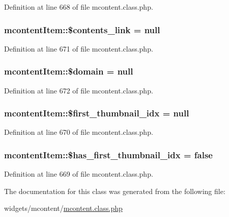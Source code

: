 Definition at line 668 of file mcontent.\+class.\+php.

\subsubsection[{\texorpdfstring{\$contents\+\_\+link}{$contents_link}}]{\setlength{\rightskip}{0pt plus 5cm}mcontent\+Item\+::\$contents\+\_\+link = {\bf null}}\hypertarget{classmcontentItem_afdee32faf59897fa7e02f9ed4389b411}{}\label{classmcontentItem_afdee32faf59897fa7e02f9ed4389b411}


Definition at line 671 of file mcontent.\+class.\+php.

\subsubsection[{\texorpdfstring{\$domain}{$domain}}]{\setlength{\rightskip}{0pt plus 5cm}mcontent\+Item\+::\$domain = {\bf null}}\hypertarget{classmcontentItem_ad92b662d98d23cb2a10747de7ffdada0}{}\label{classmcontentItem_ad92b662d98d23cb2a10747de7ffdada0}


Definition at line 672 of file mcontent.\+class.\+php.

\subsubsection[{\texorpdfstring{\$first\+\_\+thumbnail\+\_\+idx}{$first_thumbnail_idx}}]{\setlength{\rightskip}{0pt plus 5cm}mcontent\+Item\+::\$first\+\_\+thumbnail\+\_\+idx = {\bf null}}\hypertarget{classmcontentItem_a358e826e3ee863300d43b12a8218a5fa}{}\label{classmcontentItem_a358e826e3ee863300d43b12a8218a5fa}


Definition at line 670 of file mcontent.\+class.\+php.

\subsubsection[{\texorpdfstring{\$has\+\_\+first\+\_\+thumbnail\+\_\+idx}{$has_first_thumbnail_idx}}]{\setlength{\rightskip}{0pt plus 5cm}mcontent\+Item\+::\$has\+\_\+first\+\_\+thumbnail\+\_\+idx = false}\hypertarget{classmcontentItem_a8c95afa6c7bcad64626c9f343e77cdd4}{}\label{classmcontentItem_a8c95afa6c7bcad64626c9f343e77cdd4}


Definition at line 669 of file mcontent.\+class.\+php.



The documentation for this class was generated from the following file\+:\begin{DoxyCompactItemize}
\item 
widgets/mcontent/\hyperlink{mcontent_8class_8php}{mcontent.\+class.\+php}\end{DoxyCompactItemize}
